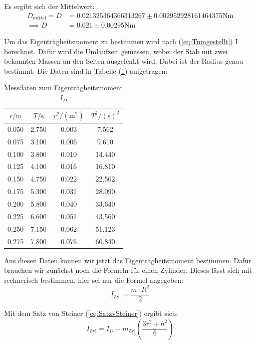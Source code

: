 Es ergibt sich der Mittelwert:
\begin{align*}
  D_{mittel} = D  & = 0.021325364366313267 \pm 0.002952928161464375 \unit{\newton\meter}\\
  \implies D &  = 0.021 \pm 0.00295 \unit{\newton\meter}
\end{align*}

Um das Eigenträgheitsmoment zu bestimmen wird nach (\ref{eq:Tumgestellt}) I berechnet.
Dafür wird die Umlaufzeit gemessen, wobei der Stab mit zwei bekannten Massen an den Seiten ausgelenkt wird.
Dabei ist der Radius genau bestimmt.
Die Daten sind in Tabelle (\ref{tab:Eigenträgheitsmoment}) aufgetragen:

\begin{table}
  \centering
  \caption{Messdaten zum Eigenträgheitsmoment $I_{D}$}
  \label{tab:Eigenträgheitsmoment}
  \begin{tabular}{c c c c}
    \toprule
    $r / \unit\meter$  &  $T / \unit\second$ & $r^2 / (\unit\meter^2)$  & $T^2 / (\unit\second)^2$\\
    \midrule
      0.050   & 2.750   & 0.003   &  7.562  \\
      0.075   & 3.100   & 0.006   &  9.610  \\
      0.100   & 3.800   & 0.010   & 14.440  \\
      0.125   & 4.100   & 0.016   & 16.810  \\
      0.150   & 4.750   & 0.022   & 22.562  \\
      0.175   & 5.300   & 0.031   & 28.090  \\
      0.200   & 5.800   & 0.040   & 33.640  \\
      0.225   & 6.600   & 0.051   & 43.560  \\
      0.250   & 7.150   & 0.062   & 51.123  \\
      0.275   & 7.800   & 0.076   & 60.840  \\
    \bottomrule
    \end{tabular}
\end{table}

Aus diesen Daten können wir jetzt das Eigenträgheitsmoment bestimmen.
Dafür brauchen wir zunächst noch die Formeln für einen Zylinder.
Dieses lässt sich mit rechnerisch bestimmen, hier sei nur die Formel angegeben:
\begin{equation*}
  I_{\text{Zyl}} = \frac{m \cdot R^2} {2}
\end{equation*}

Mit dem Satz von Steiner (\ref{eq:SatzvSteiner}) ergibt sich:
\begin{equation} \label{eq:IZyl}
  I_{\text{Zyl}} = I_{D} + m_{\text{Zyl}}  \left( \frac{3 r^2 + h^2}{6} \right)
\end{equation}

